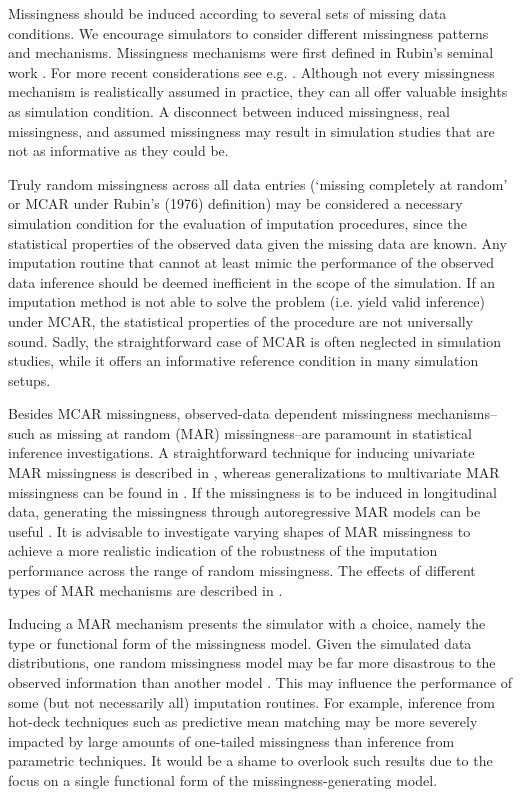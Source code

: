 \documentclass[bimj,fleqn]{w-art}
\begin{document}
Missingness should be induced according to several sets of missing data conditions. We encourage simulators to consider different missingness patterns and mechanisms. Missingness mechanisms were first defined in Rubin's seminal work \citep{rubi76}. For more recent considerations see e.g. \citet{seam13, meal15, dore18, more18, scho18, litt20, moha21, scho21}. Although not every missingness mechanism is realistically assumed in practice, they can all offer valuable insights as simulation condition. A disconnect between induced missingness, real missingness, and assumed missingness may result in simulation studies that are not as informative as they could be.

Truly random missingness across all data entries (`missing completely at random' or MCAR under Rubin's (1976) \nocite{rubi76} definition) may be considered a necessary simulation condition for the evaluation of imputation procedures, since the statistical properties of the observed data given the missing data are known. Any imputation routine that cannot at least mimic the performance of the observed data inference should be deemed inefficient in the scope of the simulation. If an imputation method is not able to solve the problem (i.e. yield valid inference) under MCAR, the statistical properties of the procedure are not universally sound. Sadly, the straightforward case of MCAR is often neglected in simulation studies, while it offers an informative reference condition in many simulation setups.

Besides MCAR missingness, observed-data dependent missingness mechanisms--such as missing at random (MAR) missingness--are paramount in statistical inference investigations. A straightforward technique for inducing univariate MAR missingness is described in \citet[][\S 3.2.4]{buur18}, whereas generalizations to multivariate MAR missingness can be found in \citet{ampute}. If the missingness is to be induced in longitudinal data, generating the missingness through autoregressive MAR models can be useful \citep[see e.g.][model 2 and model 3]{shara2015randomly}. It is advisable to investigate varying shapes of MAR missingness to achieve a more realistic indication of the robustness of the imputation performance across the range of random missingness. The effects of different types of MAR mechanisms are described in \citet{scho18}. 

Inducing a MAR mechanism presents the simulator with a choice, namely the type or functional form of the missingness model. Given the simulated data distributions, one random missingness model may be far more disastrous to the observed information than another model \citep{scho18}. This may influence the performance of some (but not necessarily all) imputation routines. For example, inference from hot-deck techniques such as predictive mean matching \citep{little1988missing, rubin1986statistical} may be more severely impacted by large amounts of one-tailed missingness than inference from parametric techniques. It would be a shame to overlook such results due to the focus on a single functional form of the missingness-generating model.
\end{document}
